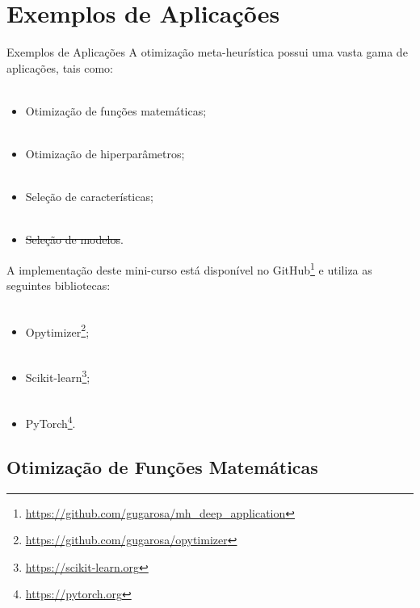 \section{Exemplos de Aplicações}
\label{s.applications}

\begin{frame}{Exemplos de Aplicações}
	\justifying
	A otimização meta-heurística possui uma vasta gama de aplicações, tais como:
	\\~\\
	\begin{itemize}
		\justifying
		\item Otimização de funções matemáticas;
		\\~\\
		\item Otimização de hiperparâmetros;
		\\~\\
		\item Seleção de características;
		\\~\\
		\item \sout{Seleção de modelos}.
	\end{itemize}
\end{frame}

\begin{frame}
	\justifying
	A implementação deste mini-curso está disponível no GitHub\footnote{\url{https://github.com/gugarosa/mh_deep_application}} e utiliza as seguintes bibliotecas:
	\\~\\
	\begin{itemize}
		\justifying
		\item Opytimizer\footnote{\url{https://github.com/gugarosa/opytimizer}};
		\\~\\
		\item Scikit-learn\footnote{\url{https://scikit-learn.org}};
		\\~\\
		\item PyTorch\footnote{\url{https://pytorch.org}}.
	\end{itemize}
\end{frame}


\subsection{Otimização de Funções Matemáticas}
\label{ss.applications_benchmark}


